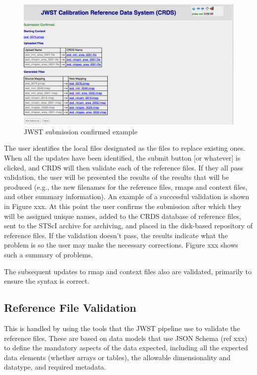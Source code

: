 \documentclass[final,authoryear,5p,times,twocolumn]{elsarticle}
\begin{document}
\begin{figure}[ht!]
\centering
\includegraphics[width=180mm]{JWST_Submission_Confirmed.png}
\caption{JWST submission confirmed example}
\label{fig:confirmedsubmission}
\end{figure}



The user identifies the local files designated as the files to replace existing
ones. When all the updates have been identified, the submit button [or
whatever] is clicked, and CRDS will then validate each of the reference
files. If they all pass validation, the user will be presented the results of
the results that will be produced (e.g., the new filenames for the reference
files, rmaps and context files, and other summary information). An example of a
successful validation is shown in Figure xxx. At this point the user confirms
the submission after which they will be assigned unique names, added to the
CRDS database of reference files, sent to the STScI archive for archiving, and
placed in the disk-based repository of reference files. If the validation
doesn't pass, the results indicate what the problem is so the user may make the
necessary corrections. Figure xxx shows such a summary of problems.

The subsequent updates to rmap and context files also are validated, primarily
to ensure the syntax is correct.

\subsection{Reference File Validation}

This is handled by using the tools that the JWST pipeline use to validate the
reference files. These are based on data models that use JSON Schema (ref xxx)
to define the mandatory aspects of the data expected, including all the
expected data elements (whether arrays or tables), the allowable dimensionality
and datatype, and required metadata.
\end{document}
